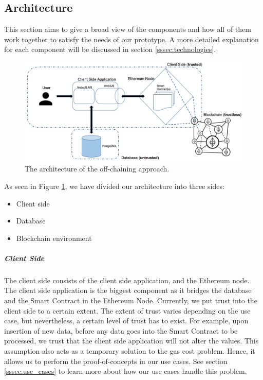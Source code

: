 \subsection{Architecture}

This section aims to give a broad view of the components and how all of them work together to satisfy the needs of our prototype. A more detailed explanation for each component will be discussed in section \ref{sssec:technologies}.

\begin{figure}[t]%
\centering
\includegraphics[width=1.0\textwidth]{images/architecture.png}
\caption{\label{fig:architecture}The architecture of the off-chaining approach.}
\end{figure}

As seen in Figure \ref{fig:architecture}, we have divided our architecture into three sides:
\begin{itemize}
\item Client side
\item Database
\item Blockchain environment
\end{itemize}

\subparagraph{Client Side}
The client side consists of the client side application, and the Ethereum node. The client side application is the biggest component as it bridges the database and the Smart Contract in the Ethereum Node. Currently, we put trust into the client side to a certain extent. The extent of trust varies depending on the use case, but nevertheless, a certain level of trust has to exist. For example, upon insertion of new data, before any data goes into the Smart Contract to be processed, we trust that the client side application will not alter the values. This assumption also acts as a temporary solution to the gas cost problem. Hence, it allows us to perform the proof-of-concepts in our use cases. See section \ref{sssec:use_cases} to learn more about how our use cases handle this problem.


